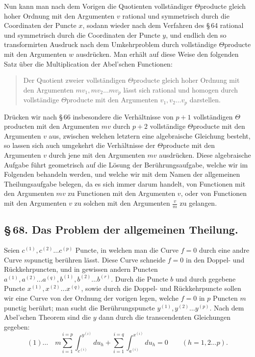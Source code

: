 \documentclass[10pt]{article}
\begin{document}
Nun kann man nach dem Vorigen die Quotienten vollständiger \(\Theta\)producte gleich hoher Ordnung mit den Argumenten \(v\) rational und symmetrisch durch die Coordinaten der Puncte \(x\), sodann wieder nach dem Verfahren des \S\,64 rational und symmetrisch durch die Coordinaten der Puncte \(y\), und endlich den so transformirten Ausdruck nach dem Umkehrproblem durch vollständige \(\Theta\)producte mit den Argumenten \(w\) ausdrücken. Man erhält auf diese Weise den folgenden Satz über die Multiplication der Abel'schen Functionen:

\begin{quote}
Der Quotient zweier vollständigen \(\Theta\)producte gleich hoher Ordnung mit den Argumenten \(mv_1,mv_2\ldots mv_p\) lässt sich rational und homogen durch vollständige \(\Theta\)producte mit den Argumenten \(v_1,v_2\ldots v_p\) darstellen.
\end{quote}

Drücken wir nach \S\,66 insbesondere die Verhältnisse von \(p+1\) vollständigen \(\Theta\)producten mit den Argumenten \(mv\) durch \(p+2\) vollständige \(\Theta\)producte mit den Argumenten \(v\) aus, zwischen welchen letztern eine algebraische Gleichung besteht, so lassen sich auch umgekehrt die Verhältnisse der \(\Theta\)producte mit den Argumenten \(v\) durch jene mit den Argumenten \(mv\) ausdrücken. Diese algebraische Aufgabe führt geometrisch auf die Lösung der Berührungsaufgabe, welche wir im Folgenden behandeln werden, und welche wir mit dem Namen der allgemeinen Theilungsaufgabe belegen, da es sich immer darum handelt, von Functionen mit den Argumenten \(mv\) zu Functionen mit den Argumenten \(v\), oder von Functionen mit den Argumenten \(v\) zu solchen mit den Argumenten \(\frac{v}{m}\) zu gelangen.

\subsection*{\S\,68. Das Problem der allgemeinen Theilung.}

Seien \(c^{(1)},c^{(2)}\ldots c^{(p)}\) Puncte, in welchen man die Curve \(f=0\) durch eine andre Curve \(m\)punctig berühren lässt. Diese Curve schneide \(f=0\) in den Doppel- und Rückkehrpuncten, und in gewissen andern Puncten \(a^{(1)},a^{(2)}\ldots a^{(q)},b^{(1)},b^{(2)}\ldots b^{(r)}\). Durch die Puncte \(b\) und durch gegebene Puncte \(x^{(1)},x^{(2)}\ldots x^{(q)}\), sowie durch die Doppel- und Rückkehrpuncte sollen wir eine Curve von der Ordnung der vorigen legen, welche \(f=0\) in \(p\) Puncten \(m\)punctig berührt; man sucht die Berührungspuncte \(y^{(1)},y^{(2)}\ldots y^{(p)}\). Nach dem Abel'schen Theorem sind die \(y\) dann durch die transcendenten Gleichungen gegeben:
\[
(1)\ldots\quad
m\sum_{i=1}^{i=p}\int_{c^{(i)}}^{y^{(i)}}du_h+
\sum_{i=1}^{i=q}\int_{a^{(i)}}^{x^{(i)}}du_h=0
\qquad(h=1,2\ldots p).
\]
\end{document}
